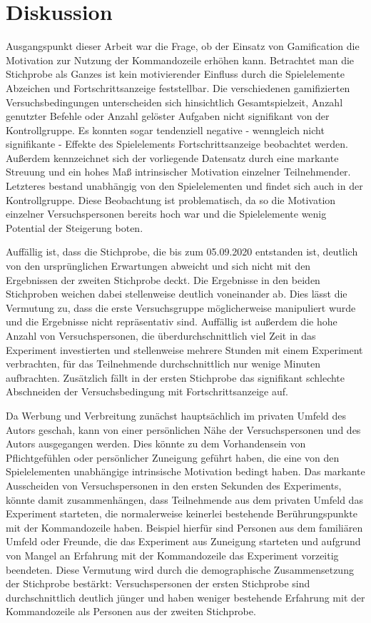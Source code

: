 \section{Diskussion}
Ausgangspunkt dieser Arbeit war die Frage, ob der Einsatz von Gamification die Motivation zur Nutzung der Kommandozeile erhöhen kann. Betrachtet man die Stichprobe als Ganzes ist kein motivierender Einfluss durch die Spielelemente Abzeichen und Fortschrittsanzeige feststellbar. Die verschiedenen gamifizierten Versuchsbedingungen unterscheiden sich hinsichtlich Gesamtspielzeit, Anzahl genutzter Befehle oder Anzahl gelöster Aufgaben nicht signifikant von der Kontrollgruppe. Es konnten sogar tendenziell negative - wenngleich nicht signifikante - Effekte des Spielelements Fortschrittsanzeige beobachtet werden. Außerdem kennzeichnet sich der vorliegende Datensatz durch eine markante Streuung und ein hohes Maß intrinsischer Motivation einzelner Teilnehmender. Letzteres bestand unabhängig von den Spielelementen und findet sich auch in der Kontrollgruppe. Diese Beobachtung ist problematisch, da so die Motivation einzelner Versuchspersonen bereits hoch war und die Spielelemente wenig Potential der Steigerung boten.

Auffällig ist, dass die Stichprobe, die bis zum 05.09.2020 entstanden ist, deutlich von den ursprünglichen Erwartungen abweicht und sich nicht mit den Ergebnissen der zweiten Stichprobe deckt. Die Ergebnisse in den beiden Stichproben weichen dabei stellenweise deutlich voneinander ab. Dies lässt die Vermutung zu, dass die erste Versuchsgruppe möglicherweise manipuliert wurde und die Ergebnisse nicht repräsentativ sind. Auffällig ist außerdem die hohe Anzahl von Versuchspersonen, die überdurchschnittlich viel Zeit in das Experiment investierten und stellenweise mehrere Stunden mit einem Experiment verbrachten, für das Teilnehmende durchschnittlich nur wenige Minuten aufbrachten. Zusätzlich fällt in der ersten Stichprobe das signifikant schlechte Abschneiden der Versuchsbedingung mit Fortschrittsanzeige auf.

Da Werbung und Verbreitung zunächst hauptsächlich im privaten Umfeld des Autors geschah, kann von einer persönlichen Nähe der Versuchspersonen und des Autors ausgegangen werden. Dies könnte zu dem Vorhandensein von Pflichtgefühlen oder persönlicher Zuneigung geführt haben, die eine von den Spielelementen unabhängige intrinsische Motivation bedingt haben. Das markante Ausscheiden von Versuchspersonen in den ersten Sekunden des Experiments, könnte damit zusammenhängen, dass Teilnehmende aus dem privaten Umfeld das Experiment starteten, die normalerweise keinerlei bestehende Berührungspunkte mit der Kommandozeile haben. Beispiel hierfür sind Personen aus dem familiären Umfeld oder Freunde, die das Experiment aus Zuneigung starteten und aufgrund von Mangel an Erfahrung mit der Kommandozeile das Experiment vorzeitig beendeten. Diese Vermutung wird durch die demographische Zusammensetzung der Stichprobe bestärkt: Versuchspersonen der ersten Stichprobe sind durchschnittlich deutlich jünger und haben weniger bestehende Erfahrung mit der Kommandozeile als Personen aus der zweiten Stichprobe.

